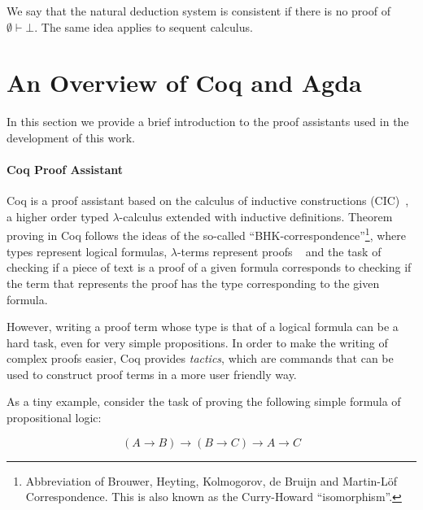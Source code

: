 We say that the natural deduction system is consistent if there is no proof of $\emptyset\vdash \bot$. The same idea applies to sequent calculus.


\section{An Overview of Coq and Agda}\label{sec:coq}


In this section we provide a brief introduction to the proof assistants used in the development of this work.


\paragraph{Coq Proof Assistant} Coq is a proof assistant based on the calculus of inductive
constructions (CIC)~\cite{Bertot04}, a higher order typed
$\lambda$-calculus extended with inductive definitions.  Theorem
proving in Coq follows the ideas of the so-called
``BHK-correspondence''\footnote{Abbreviation of Brouwer, Heyting,
  Kolmogorov, de Bruijn and Martin-L\"of Correspondence. This is also
  known as the Curry-Howard ``isomorphism''.}, where types represent
logical formulas, $\lambda$-terms represent proofs
~\cite{Sorensen06} and the task of checking if a piece of text is a
proof of a given formula corresponds to checking if the term that
represents the proof has the type corresponding to the given formula.


However, writing a proof term whose type is that of a logical formula
can be a hard task, even for very simple propositions.  In order to
make the writing of complex proofs easier, Coq provides
\emph{tactics}, which are commands that can be used to construct proof
terms in a more user friendly way.


As a tiny example, consider the task of proving the following simple
formula of propositional logic:

\[
(A \to B)\to (B\to C) \to A \to C
\]

